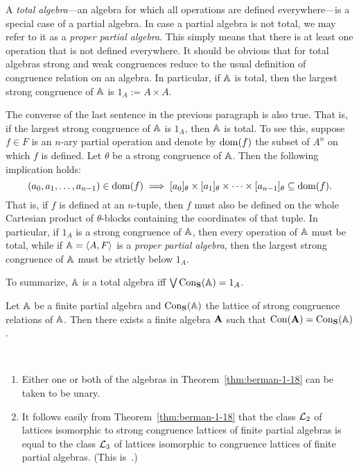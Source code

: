 A \emph{total algebra}---an algebra for which all operations are defined everywhere---is
a special case of a partial algebra. In case a partial algebra is not total,
we may refer to it as a \emph{proper partial algebra}.
This simply means that there is at least one operation that is not defined everywhere.
It should be obvious that for total algebras strong and weak congruences reduce to the usual
definition of congruence relation on an algebra.
In particular, if $\mathbb{A}$ is total, then the largest strong congruence of $\mathbb{A}$ is $1_A := A\times A$.

The converse of the last sentence in the previous paragraph is also true.
That is, if the largest strong congruence of $\mathbb{A}$ is $1_A$, then $\mathbb{A}$ is total.
To see this, suppose $f \in F$ is an $n$-ary partial operation and 
denote by $\operatorname{dom}(f)$ the subset of $A^n$ on which $f$ is defined.
Let $\theta$ be a strong congruence of $\mathbb{A}$.
Then the following implication holds:
\[ (a_0, a_1, \dots, a_{n-1})\in \operatorname{dom}(f) \;  \Longrightarrow \;
   [a_0]_\theta \times [a_1]_\theta \times \cdots \times [a_{n-1}]_\theta \subseteq \operatorname{dom}(f).
   \]
That is, if $f$ is defined at an $n$-tuple,
then $f$ must also be defined on the whole Cartesian product of $\theta$-blocks containing the
coordinates of that tuple.
In particular, if $1_A$ is a strong congruence of $\mathbb{A}$, then every operation of
$\mathbb{A}$ must be total, while if $\mathbb{A} = \langle A, F\rangle$ is a \emph{proper partial algebra},
then the largest strong congruence of $\mathbb{A}$
must be strictly below $1_A$.

To summarize, $\mathbb{A}$ is a total algebra iff $\bigvee \operatorname{Con_{\mathbf{S}}}(\mathbb{A}) = 1_A$.

\begin{theorem}
  \label{thm:berman-1-18}
  Let $\mathbb{A}$ be a finite partial algebra and $\operatorname{Con_{\mathbf{S}}}(\mathbb{A})$ the lattice of strong
  congruence relations of $\mathbb{A}$.  Then there exists a finite algebra $\mathbf{A}$
  such that $\operatorname{Con}(\mathbf{A}) = \operatorname{Con_{\mathbf{S}}}(\mathbb{A})$.
\end{theorem}
\begin{remarks}\
  \begin{enumerate}
  \item  Either one or both of the algebras in Theorem~\ref{thm:berman-1-18} can be
    taken to be unary.
  \item It follows easily from Theorem~\ref{thm:berman-1-18} that the class
    $\mathcal{L}_2$ of lattices isomorphic to strong congruence lattices of finite
    partial algebras is equal to the class $\mathcal{L}_3$ of lattices isomorphic to
    congruence lattices of finite partial algebras.
    (This is~\cite[Thm~1.19]{MR2619731}.)
  \end{enumerate}
\end{remarks}


